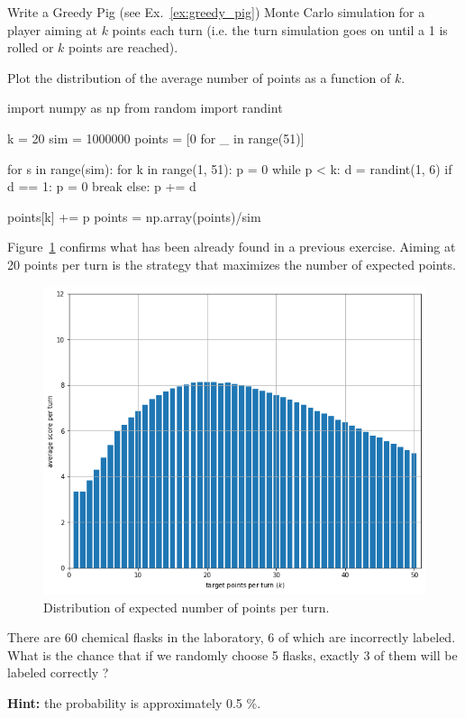 \begin{question}
Write a Greedy Pig (see Ex.~\ref{ex:greedy_pig}) Monte Carlo simulation for a player aiming at $k$ points each turn (i.e. the turn simulation goes on until a 1 is rolled or $k$ points are reached).

Plot the distribution of the average number of points as a function of $k$.
\end{question}
\cprotEnv\begin{solution}
\begin{ipython}
import numpy as np
from random import randint

k = 20
sim = 1000000
points = [0 for _ in range(51)]

for s in range(sim):
    for k in range(1, 51):
        p = 0 
        while p < k:
            d = randint(1, 6)
            if d == 1:
                p = 0
                break
            else:
                p += d

points[k] += p
points = np.array(points)/sim
\end{ipython}

Figure~\ref{fig:greedy_pig_sim} confirms what has been already found in a previous exercise. Aiming at 20 points per turn is the strategy that maximizes the number of expected points.

\begin{figure}[htbp]
	\begin{center}
		\includegraphics[width=0.7\linewidth]{figures/greedy_pig_sim}
	\end{center}
\caption{Distribution of expected number of points per turn.}
\label{fig:greedy_pig_sim}
\end{figure}
\end{solution}

\begin{question}
There are 60 chemical flasks in the laboratory, 6 of which are incorrectly labeled. What is the chance that if we randomly choose 5 flasks, exactly 3 of them will be labeled correctly ?

\noindent\textbf{Hint:} the probability is approximately 0.5 \%.
\end{question}

